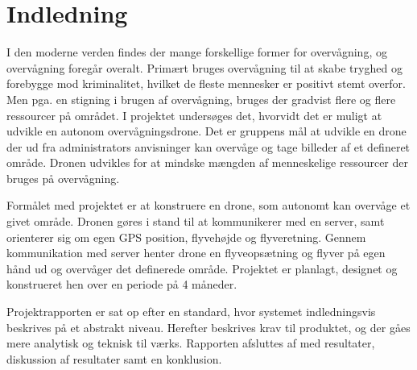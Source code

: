 \chapter{Indledning}
\label{chap:indledning}

I den moderne verden findes der mange forskellige former for overvågning, og overvågning foregår overalt. Primært bruges overvågning til at skabe tryghed og forebygge mod kriminalitet, hvilket de fleste mennesker er positivt stemt overfor. Men pga. en stigning i brugen af overvågning, bruges der gradvist flere og flere ressourcer på området. 
I projektet undersøges det, hvorvidt det er muligt at udvikle en autonom overvågningsdrone. Det er gruppens mål at udvikle en drone der ud fra administrators anvisninger kan overvåge og tage billeder af et defineret område. Dronen udvikles for at mindske mængden af menneskelige ressourcer der bruges på overvågning.

Formålet med projektet er at konstruere en drone, som autonomt kan overvåge et givet område. Dronen gøres i stand til at kommunikerer med en server, samt orienterer sig om egen GPS position, flyvehøjde og flyveretning. Gennem kommunikation med server henter drone en flyveopsætning og flyver på egen hånd ud og overvåger det definerede område.
Projektet er planlagt, designet og konstrueret hen over en periode på 4 måneder.

Projektrapporten er sat op efter en standard, hvor systemet indledningsvis beskrives på et abstrakt niveau. Herefter beskrives krav til produktet, og der gåes mere analytisk og teknisk til værks. Rapporten afsluttes af med resultater, diskussion af resultater samt en konklusion.


